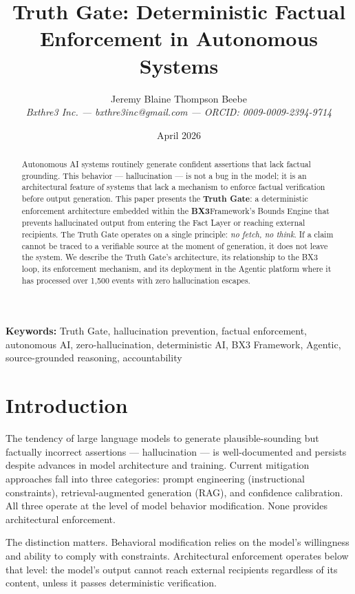 \documentclass[12pt]{article}
\title{Truth Gate: Deterministic Factual Enforcement in Autonomous Systems}
\author{Jeremy Blaine Thompson Beebe\\ \textit{Bxthre3 Inc. --- bxthre3inc@gmail.com --- ORCID: 0009-0009-2394-9714}}
\date{April 2026}
\newcommand{\bxthree}{\textbf{BX3}}
\begin{document}
\maketitle

\begin{abstract}
\noindent
Autonomous AI systems routinely generate confident assertions that lack factual grounding. This behavior --- hallucination --- is not a bug in the model; it is an architectural feature of systems that lack a mechanism to enforce factual verification before output generation. This paper presents the \textbf{Truth Gate}: a deterministic enforcement architecture embedded within the \bxthree Framework's Bounds Engine that prevents hallucinated output from entering the Fact Layer or reaching external recipients. The Truth Gate operates on a single principle: \textit{no fetch, no think}. If a claim cannot be traced to a verifiable source at the moment of generation, it does not leave the system. We describe the Truth Gate's architecture, its relationship to the BX3 loop, its enforcement mechanism, and its deployment in the Agentic platform where it has processed over 1,500 events with zero hallucination escapes.
\end{abstract}

\medskip
\noindent\textbf{Keywords:} Truth Gate, hallucination prevention, factual enforcement, autonomous AI, zero-hallucination, deterministic AI, BX3 Framework, Agentic, source-grounded reasoning, accountability

\newpage

\section{Introduction}
\label{sec:intro}

The tendency of large language models to generate plausible-sounding but factually incorrect assertions --- hallucination --- is well-documented and persists despite advances in model architecture and training. Current mitigation approaches fall into three categories: prompt engineering (instructional constraints), retrieval-augmented generation (RAG), and confidence calibration. All three operate at the level of model behavior modification. None provides architectural enforcement.

The distinction matters. Behavioral modification relies on the model's willingness and ability to comply with constraints. Architectural enforcement operates below that level: the model's output cannot reach external recipients regardless of its content, unless it passes deterministic verification.
\end{document}
